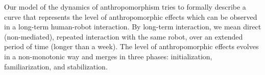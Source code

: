\documentclass{sig-alternate-2013}
\begin{document}
%
%
%
%



Our model of the dynamics of anthropomorphism tries to formally describe a curve that
represents the level of anthropomorphic effects which can be observed in a long-term human-robot interaction. By long-term interaction, we mean direct (non-mediated), repeated interaction with the same robot, over an extended period of time (longer than a week).
The level of anthropomorphic effects evolves in a non-monotonic way and merges in three phases: initialization, familiarization, and stabilization.
\end{document}
